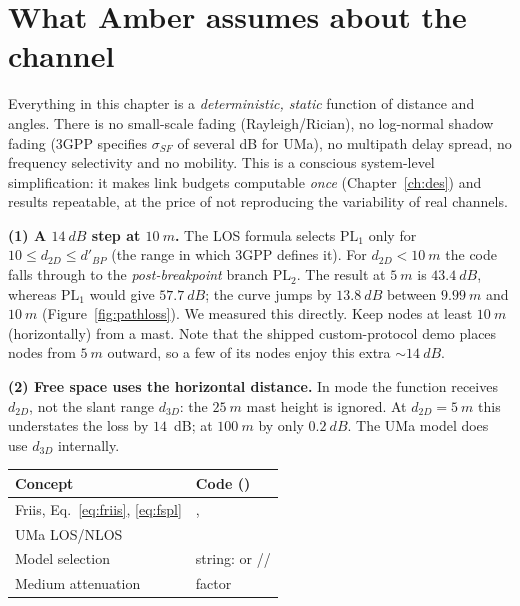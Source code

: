 \section{What Amber assumes about the channel}

Everything in this chapter is a \emph{deterministic, static} function of
distance and angles. There is no small-scale fading (Rayleigh/Rician), no
log-normal shadow fading (3GPP specifies $\sigma_{SF}$ of several dB for UMa),
no multipath delay spread, no frequency selectivity and no
mobility. This is a conscious system-level simplification: it makes link budgets
computable \emph{once} (Chapter~\ref{ch:des}) and results repeatable, at the
price of not reproducing the variability of real channels.

\begin{reality}
\textbf{(1) A $\SI{14}{dB}$ step at $\SI{10}{m}$.} The LOS formula selects
$\mathrm{PL}_1$ only for $10\le d_{2D}\le d'_{BP}$ (the range in which 3GPP defines
it). For $d_{2D}<\SI{10}{m}$ the code falls through to the \emph{post-breakpoint}
branch $\mathrm{PL}_2$. The result at $\SI{5}{m}$ is $\SI{43.4}{dB}$, whereas
$\mathrm{PL}_1$ would give $\SI{57.7}{dB}$; the curve jumps by $\SI{13.8}{dB}$ between
$\SI{9.99}{m}$ and $\SI{10}{m}$ (Figure~\ref{fig:pathloss}). We measured this directly.
Keep nodes at least $\SI{10}{m}$ (horizontally) from a mast. Note that the shipped custom-protocol demo
places nodes from $\SI{5}{m}$ outward, so a few of its nodes enjoy this extra $\sim\SI{14}{dB}$.

\textbf{(2) Free space uses the horizontal distance.} In
 mode the function receives $d_{2D}$, not the slant range
$d_{3D}$: the $\SI{25}{m}$ mast height is ignored. At $d_{2D}=\SI{5}{m}$ this understates
the loss by $14$~dB; at $\SI{100}{m}$ by only $\SI{0.2}{dB}$. The UMa model does
use $d_{3D}$ internally.
\end{reality}

\begin{codemap}
\small
\begin{tabularx}{\linewidth}{@{}>{\ttfamily}p{5.2cm}X@{}}
\toprule
\normalfont\bfseries Concept & \normalfont\bfseries Code (\file{amber/propagation.py})\\
\midrule
Friis, Eq.~\eqref{eq:friis}, \eqref{eq:fspl} & \code{fspl_lin}, \codew{compute_rx_power_watts}\\
UMa LOS/NLOS & \codew{urban_macro_loss_db_38_901}\\
Model selection & \code{pathloss} string: \code{"fspl"} or \code{"macro"}/\code{"3gpp"}/\code{"urban"}\\
Medium attenuation & factor \codew{np.exp(-extra_np_per_m * distance_m)}\\
\bottomrule
\end{tabularx}
\end{codemap}

